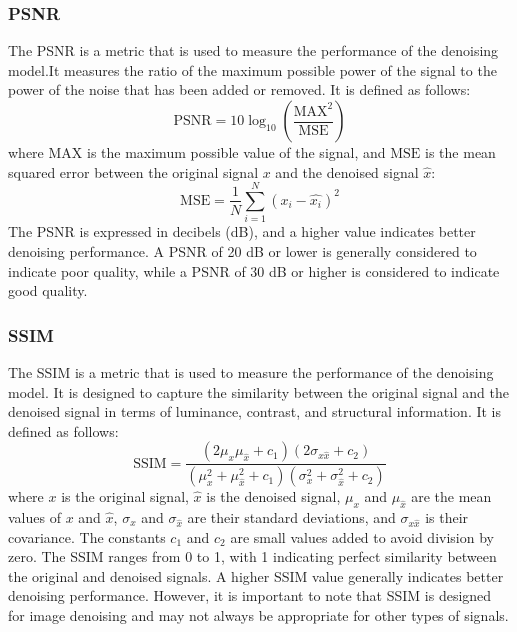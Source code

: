 \documentclass[a4paper]{sapthesis}
\begin{document}
\subsubsection{PSNR}
The PSNR is a metric that is used to measure the performance of the
denoising model.It measures the ratio of the maximum possible power of 
the signal to the power of the noise that has been added or removed. 
It is defined as follows:
\begin{equation}
\text{PSNR} = 10 \log_{10} \left(\frac{\text{MAX}^2}{\text{MSE}}\right)
\end{equation}
where $\text{MAX}$ is the maximum possible value of the signal, 
and $\text{MSE}$ is the mean squared error between the original 
signal $x$ and the denoised signal $\hat{x}$:
\begin{equation}
\text{MSE} = \frac{1}{N}\sum_{i=1}^{N} (x_i - \hat{x_i})^2
\end{equation}
The PSNR is expressed in decibels (dB), and a higher value indicates 
better denoising performance. A PSNR of 20 dB or lower is generally 
considered to indicate poor quality, while a PSNR of 30 dB or higher 
is considered to indicate good quality.
\subsubsection{SSIM}
The SSIM is a metric that is used to measure the performance of the
denoising model. It is designed to capture the similarity between the 
original signal and the denoised signal in terms of luminance, 
contrast, and structural information. It is defined as follows:
\begin{equation}
\text{SSIM} = \frac{(2\mu_x\mu_{\hat{x}} + c_1)(2\sigma_{x {\hat{x}}} + c_2)}{(\mu_x^2 + \mu_{\hat{x}}^2 + c_1)(\sigma_x^2 + \sigma_{\hat{x}}^2 + c_2)}
\end{equation}
where $x$ is the original signal, $\hat{x}$ is the denoised signal, 
$\mu_x$ and $\mu_{\hat{x}}$ are the mean values of $x$ and $\hat{x}$, 
$\sigma_x$ and $\sigma_{\hat{x}}$ are their standard deviations, and 
$\sigma_{x\hat{x}}$ is their covariance. The constants $c_1$ and $c_2$ 
are small values added to avoid division by zero.\newline
The SSIM ranges from 0 to 1, with 1 indicating perfect similarity between 
the original and denoised signals. A higher SSIM value generally indicates 
better denoising performance. However, it is important to note that SSIM 
is designed for image denoising and may not always be appropriate for 
other types of signals.
\end{document}

